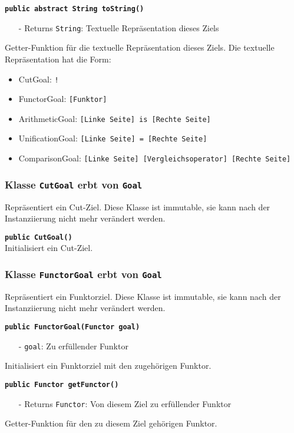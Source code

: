 \documentclass[parskip=full,11pt,twoside]{scrartcl}
\begin{document}
\textbf{\texttt{public abstract String toString()}}
\begin{itemize}[noitemsep]
	\item[-] Returns \texttt{String}: Textuelle Repräsentation dieses Ziels
\end{itemize}
Getter-Funktion für die textuelle Repräsentation dieses Ziels. Die textuelle Repräsentation hat die Form:
\begin{itemize}
	\item CutGoal: \texttt{!}
	\item FunctorGoal: \texttt{[Funktor]}
	\item ArithmeticGoal: \texttt{[Linke Seite] is [Rechte Seite]}
	\item UnificationGoal: \texttt{[Linke Seite] = [Rechte Seite]}
	\item ComparisonGoal: \texttt{[Linke Seite] [Vergleichsoperator] [Rechte Seite]}
\end{itemize}

\subsubsection{Klasse \texttt{CutGoal} erbt von \texttt{Goal}}
Repräsentiert ein Cut-Ziel. Diese Klasse ist immutable, sie kann nach der Instanziierung nicht mehr verändert werden.

\textbf{\texttt{public CutGoal()}}\\
Initialisiert ein Cut-Ziel.

\subsubsection{Klasse \texttt{FunctorGoal} erbt von \texttt{Goal}}
Repräsentiert ein Funktorziel. Diese Klasse ist immutable, sie kann nach der Instanziierung nicht mehr verändert werden.

\textbf{\texttt{public FunctorGoal(Functor goal)}}
\begin{itemize}[noitemsep]
	\item[-] \texttt{goal}: Zu erfüllender Funktor
\end{itemize}
Initialisiert ein Funktorziel mit den zugehörigen Funktor.

\textbf{\texttt{public Functor getFunctor()}}
\begin{itemize}[noitemsep]
	\item[-] Returns \texttt{Functor}: Von diesem Ziel zu erfüllender Funktor
\end{itemize}
Getter-Funktion für den zu diesem Ziel gehörigen Funktor.
\end{document}
